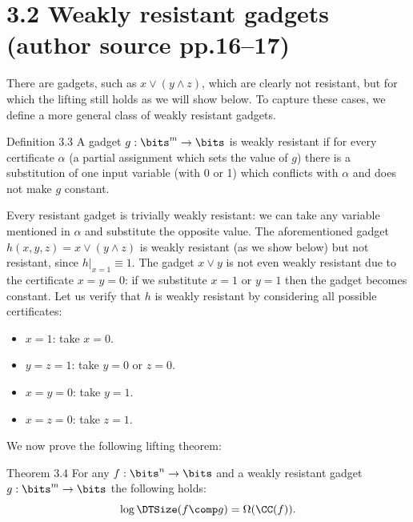 \section*{3.2 Weakly resistant gadgets (author source pp.16--17)}
There are gadgets, such as $x\vee(y\wedge z)$, which are clearly not resistant, but for which the lifting still holds as we will show below. To capture these cases, we define a more general class of weakly resistant gadgets.
\begin{originalresult}{Definition 3.3}
A gadget $g:\bits^m\to\bits$ is weakly resistant if for every certificate $\alpha$ (a partial assignment which sets the value of $g$) there is a substitution of one input variable (with 0 or 1) which conflicts with $\alpha$ and does not make $g$ constant.
\end{originalresult}
Every resistant gadget is trivially weakly resistant: we can take any variable mentioned in $\alpha$ and substitute the opposite value. The aforementioned gadget $h(x,y,z)=x\vee(y\wedge z)$ is weakly resistant (as we show below) but not resistant, since $h|_{x=1}\equiv1$. The gadget $x\vee y$ is not even weakly resistant due to the certificate $x=y=0$: if we substitute $x=1$ or $y=1$ then the gadget becomes constant.
Let us verify that $h$ is weakly resistant by considering all possible certificates:
\begin{itemize}
\item $x=1$: take $x=0$.
\item $y=z=1$: take $y=0$ or $z=0$.
\item $x=y=0$: take $y=1$.
\item $x=z=0$: take $z=1$.
\end{itemize}
We now prove the following lifting theorem:
\begin{originalresult}{Theorem 3.4}
For any $f:\bits^n\to\bits$ and a weakly resistant gadget $g:\bits^m\to\bits$ the following holds:
\[\log\DTSize(f\comp g)=\Omega(\CC(f)).\]
\end{originalresult}
